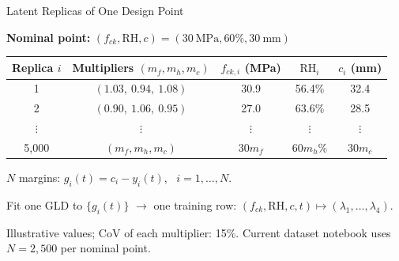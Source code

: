 \begin{frame}{Latent Replicas of One Design Point}

\small
\centering
\textbf{Nominal point:} $(f_{ck},\mathrm{RH},c)=(30\ \mathrm{MPa},60\%,30\ \mathrm{mm})$

\vspace{0.25cm}

\vspace{0.1cm}
{\scriptsize\renewcommand{\arraystretch}{1.22}
\begin{tabular}{c c c c c}
\toprule
Replica $i$ & Multipliers $(m_f,m_h,m_c)$ & $f_{ck,i}$ (MPa) & $\mathrm{RH}_i$ & $c_i$ (mm) \\
\midrule
1 & $(1.03,\ 0.94,\ 1.08)$ & 30.9 & 56.4\% & 32.4 \\
2 & $(0.90,\ 1.06,\ 0.95)$ & 27.0 & 63.6\% & 28.5 \\
$\vdots$ & $\vdots$ & $\vdots$ & $\vdots$ & $\vdots$ \\
5{,}000 & $(m_f,m_h,m_c)$ & $30m_f$ & $60m_h$\% & $30m_c$ \\
\bottomrule
\end{tabular}}

\vspace{0.17cm}
{\small $N$ margins: $g_i(t)=c_i-y_i(t)$, \ $i=1,\ldots,N$.}

\vspace{0.14cm}
{\small Fit one GLD to $\{g_i(t)\}$ $\longrightarrow$ one training row:
$(f_{ck},\mathrm{RH},c,t)\mapsto(\lambda_1,\ldots,\lambda_4)$.}

\vspace{0.08cm}
\raggedright
\tiny Illustrative values; CoV of each multiplier: 15\%. Current dataset notebook uses $N=2{,}500$ per nominal point.

\end{frame}

